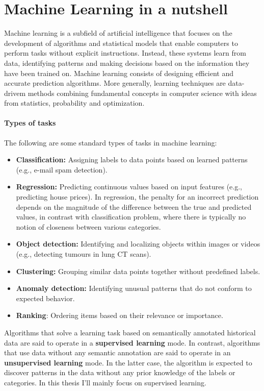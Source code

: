 \chapter{Machine Learning in a nutshell} 
\label{cap:machine_learning}

Machine learning is a subfield of artificial intelligence that focuses on the development of algorithms and statistical models that enable computers to perform tasks without explicit instructions. Instead, these systems learn from data, identifying patterns and making decisions based on the information they have been trained on.
Machine learning consists of designing efficient and accurate prediction algorithms. More generally, learning techniques are data-drivem methods combining fundamental concepts in computer science with ideas from statistics, probability and optimization.
\subsubsection{Types of tasks}
The following are some standard types of tasks in machine learning:
\begin{itemize}
    \item \textbf{Classification:} Assigning labels to data points based on learned patterns (e.g., e-mail spam detection).
    \item \textbf{Regression:} Predicting continuous values based on input features (e.g., predicting house prices). In regression, the penalty for an incorrect prediction depends on the magnitude of the difference between the true and predicted values, in contrast with classification problem, where there is typically no notion of closeness between various categories. 
    \item \textbf{Object detection:} Identifying and localizing objects within images or videos (e.g., detecting tumours in lung CT scans).
    \item \textbf{Clustering:} Grouping similar data points together without predefined labels.
    \item \textbf{Anomaly detection:} Identifying unusual patterns that do not conform to expected behavior.
    \item \textbf{Ranking}: Ordering items based on their relevance or importance.
\end{itemize}

Algorithms that solve a learning task based on semantically annotated historical data are said to operate in a \textbf{supervised learning} mode. In contrast, algorithms that use data without any semantic annotation are said to operate in an \textbf{unsupervised learning} mode. In the latter case, the algorithm is expected to discover patterns in the data without any prior knowledge of the labels or categories.
In this thesis I'll mainly focus on supervised learning. 

